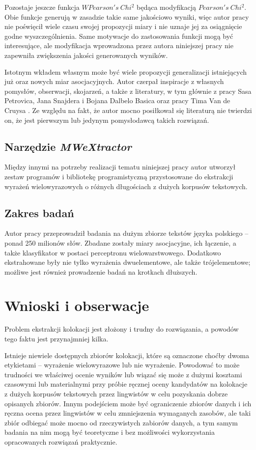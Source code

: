 \par
Pozostaje jeszcze funkcja $ W Pearson's \: Chi^{2} $ będąca modyfikacją $ Pearson's \: Chi^{2} $.
Obie funkcje generują w zasadzie takie same jakościowo wyniki, więc autor pracy nie poświęcił wiele czasu swojej propozycji miary i nie uznaje jej za osiągnięcie godne wyszczególnienia.
Same motywacje do zastosowania funkcji mogą być interesujące, ale modyfikacja wprowadzona przez autora niniejszej pracy nie zapewniła zwiększenia jakości generowanych wyników.

\par
Istotnym wkładem własnym może być wiele propozycji generalizacji istniejących już oraz nowych miar asocjacyjnych.
Autor czerpał inspiracje z własnych pomysłów, obserwacji, skojarzeń, a także z literatury, w tym głównie z pracy Sasa Petrovica, Jana Snajdera i Bojana Dalbelo Basica \cite{generalization_patterns} oraz pracy Tima Van de Cruysa \cite{mmi_w11}.
Ze względu na fakt, że autor mocno posiłkował się literaturą nie twierdzi on, że jest pierwszym lub jedynym pomysłodawcą takich rozwiązań.

\subsection{Narzędzie \protect\textit{MWeXtractor}}
Między innymi na potrzeby realizacji tematu niniejszej pracy autor utworzył zestaw programów i bibliotekę programistyczną przystosowane do ekstrakcji wyrażeń wielowyrazowych o różnych długościach z dużych korpusów tekstowych.


\subsection{Zakres badań}
Autor pracy przeprowadził badania na dużym zbiorze tekstów języka polskiego -- ponad 250 milionów słów. 
Zbadane zostały miary asocjacyjne, ich łączenie, a także klasyfikator w postaci perceptronu wielowarstwowego.
Dodatkowo ekstrahowane były nie tylko wyrażenia dwuelementowe, ale także trójelementowe; możliwe jest również prowadzenie badań na krotkach dłuższych.


\section{Wnioski i obserwacje}
Problem ekstrakcji kolokacji jest złożony i trudny do rozwiązania, a powodów tego faktu jest przynajmniej kilka.

\par
Istnieje niewiele dostępnych zbiorów kolokacji, które są oznaczone choćby dwoma etykietami -- wyrażenie wielowyrazowe lub nie wyrażenie.
Powodować to może trudności we właściwej ocenie wyników lub wiązać się może z dużymi kosztami czasowymi lub materialnymi przy próbie ręcznej oceny kandydatów na kolokacje z dużych korpusów tekstowych przez lingwistów w celu pozyskania dobrze opisanych zbiorów.
Innym podejściem może być ograniczenie zbiorów danych i ich ręczna ocena przez lingwistów w celu zmniejszenia wymaganych zasobów, ale taki zbiór odbiegać może mocno od rzeczywistych zabiorów danych, a tym samym badania na nim mogą być teoretyczne i bez możliwości wykorzystania opracowanych rozwiązań praktycznie.

